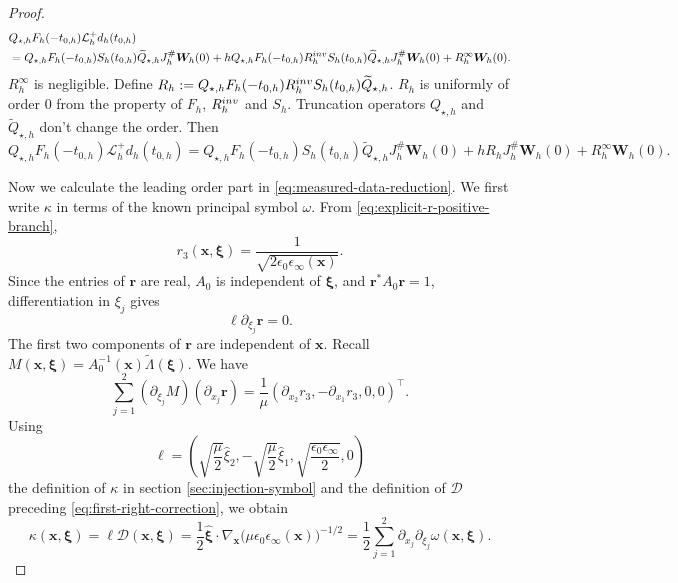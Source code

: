 \documentclass[10pt,a4paper]{amsart}
\begin{document}
\begin{proof}
\begin{align*}
    &Q_{\star,h}F_h(-t_{0,h})\mathcal L_h^+d_h(t_{0,h}) \\ 
    &=Q_{\star,h}F_h(-t_{0,h})S_h(t_{0,h})\widetilde{Q}_{\star,h}J_h^\#\bm{W}_h(0)+hQ_{\star,h}F_h(-t_{0,h})R_h^{\rm inv}S_h(t_{0,h})\widetilde{Q}_{\star,h}J_h^\#\bm{W}_h(0)+R_h^\infty\bm{W}_h(0).
\end{align*}
$R_h^\infty$ is negligible. Define $R_h:=Q_{\star,h}F_h(-t_{0,h})R_h^{\rm inv}S_h(t_{0,h})\widetilde{Q}_{\star,h}$. $R_h$ is uniformly of order 0 from the property of $F_h$, $R_h^{\rm inv}$ and $S_h$. Truncation operators $Q_{\star,h}$ and $\widetilde{Q}_{\star,h}$ don't change the order. Then 
\begin{equation}\label{eq:measured-data-reduction}
    Q_{\star,h}F_h(-t_{0,h})\mathcal L_h^+d_h(t_{0,h}) =Q_{\star,h}F_h(-t_{0,h})S_h(t_{0,h})\widetilde{Q}_{\star,h}J_h^\#\bm{W}_h(0)+hR_hJ_h^\#\bm{W}_h(0)+R_h^\infty\bm{W}_h(0).
\end{equation}

Now we calculate the leading order part in \eqref{eq:measured-data-reduction}. We first write $\kappa$ in terms of the known principal symbol $\omega$. From \eqref{eq:explicit-r-positive-branch},
\begin{equation*}
 r_3(\bm x,\bm\xi)=\frac{1}{\sqrt{2\epsilon_0\epsilon_\infty(\bm x)}}.
\end{equation*}
Since the entries of $\bm r$ are real, $A_0$ is independent of $\bm\xi$, and $\bm r^*A_0\bm r=1$, differentiation in $\xi_j$ gives
\begin{equation*}
 \bm\ell\partial_{\xi_j}\bm r=0.
\end{equation*}
The first two components of $\bm r$ are independent of $\bm x$. Recall $M(\bm x,\bm\xi) = A_0^{-1}(\bm x)\widetilde\Lambda(\bm\xi)$. We have
\begin{equation*}
 \sum_{j=1}^2(\partial_{\xi_j}M)(\partial_{x_j}\bm r)=\frac1\mu(\partial_{x_2}r_3,-\partial_{x_1}r_3,0,0)^\top.
\end{equation*}
Using
\begin{equation*}
 \bm\ell=\left(\sqrt{\frac\mu2}\widehat\xi_2,-\sqrt{\frac\mu2}\widehat\xi_1,\sqrt{\frac{\epsilon_0\epsilon_\infty}2},0\right)
\end{equation*}
the definition of $\kappa$ in section \ref{sec:injection-symbol} and the definition of $\bm{\mathcal D}$ preceding \eqref{eq:first-right-correction}, we obtain
\begin{equation*}
 \kappa(\bm x,\bm\xi)=\bm\ell\bm{\mathcal D}(\bm x,\bm\xi)=\frac12\widehat{\bm\xi}\cdot\nabla_{\bm x}\bigl(\mu\epsilon_0\epsilon_\infty(\bm x)\bigr)^{-1/2}=\frac12\sum_{j=1}^2
 \partial_{x_j}\partial_{\xi_j}\omega(\bm x,\bm\xi).
\end{equation*}


\end{proof}
\end{document}
